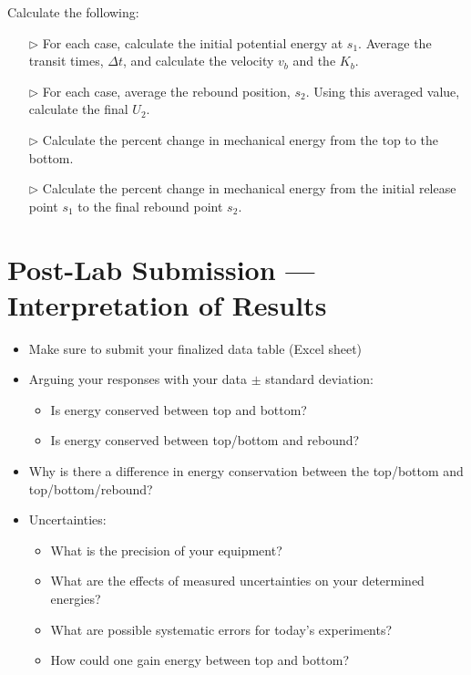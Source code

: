 \begin{itemize}
Calculate the following:
\begin{itemize}
\item[$\triangleright$] For each case, calculate the initial potential energy at $s_1$. Average the transit times, $\Delta t$, and calculate the velocity $v_b$ and the $K_b$.
\item[$\triangleright$] For each case, average the rebound position, $s_2$. Using this averaged value, calculate the final $U_2$.
\item[$\triangleright$] Calculate the percent change in mechanical energy from the top to the bottom.
\item[$\triangleright$] Calculate the percent change in mechanical energy from the initial release point $s_1$ to the final rebound point $s_2$.
\end{itemize}

\end{itemize}




\section{Post-Lab Submission --- Interpretation of Results}


\begin{itemize}
    \item Make sure to submit your finalized data table (Excel sheet)
    \item Arguing your responses with your data $\pm$ standard deviation:
    \begin{itemize}
        \item Is energy conserved between top and bottom?
        \item Is energy conserved between top/bottom and rebound?
    \end{itemize}
    \item Why is there a difference in energy conservation between the top/bottom and top/bottom/rebound?
    \item Uncertainties: 
    \begin{itemize}
        \item What is the precision of your equipment?
        \item What are the effects of measured uncertainties on your determined energies?
        \item What are possible systematic errors for today's experiments?
        \item How could one gain energy between top and bottom?
    \end{itemize}
\end{itemize}



